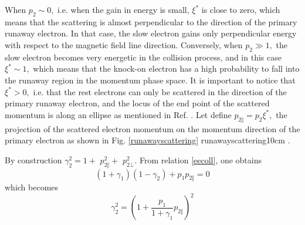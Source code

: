 When $p_{2}\sim 0,$ i.e. when the gain in energy is small, $\xi ^{\ast }$ is
close to zero, which means that the scattering is almost perpendicular to
the direction of the primary runaway electron. In that case, the slow
electron gains only perpendicular energy with respect to the magnetic field
line direction. Conversely, when $p_{2}\gg 1,$ the slow electron becomes
very energetic in the collision process, and in this case $\xi ^{\ast }\sim
1,$ which means that the knock-on electron has a high probability to fall
into the runaway region in the momentum phase space. It is important to
notice that $\xi ^{\ast }>0,$ i.e. that the rest electrons can only be
scattered in the direction of the primary runaway electron, and the locus of
the end point of the scattered momentum is along an ellipse as mentioned in
Ref. \cite{chi98}. Let define $p_{2\Vert }=p_{2}\xi ^{\ast },$ the
projection of the scattered electron momentum on the momentum direction of
the primary electron as shown in Fig. \ref{runawayscattering} 
 {runawayscattering}{10cm}%
.

By construction $\gamma _{2}^{2}=1+$ $p_{2\Vert }^{2}+$ $p_{2\bot }^{2}.$
From relation \ref{eecoll}, one obtains 
\begin{equation}
\left( 1+\gamma _{1}\right) \left( 1-\gamma _{2}\right) +p_{1}p_{2\Vert }=0
\end{equation}
which becomes 
\begin{equation}
\gamma _{2}^{2}=\left( 1+\frac{p_{1}}{1+\gamma _{1}}p_{2\Vert }\right) ^{2}
\end{equation}

